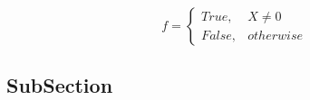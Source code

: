 \documentclass[a4paper]{article}
\begin{document}
\begin{equation}   f =
\begin{cases} True, & X \neq 0\\
False, & otherwise
\end{cases}
\end{equation}

\subsection{SubSection}
\end{document}
